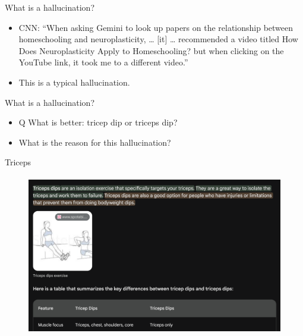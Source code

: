 \begin{vbframe}{What is a hallucination?}

\vfill


	\begin{itemize}

\item
CNN: ``When asking Gemini to look up papers on the relationship
between homeschooling and neuroplasticity, \ldots
[it] \ldots
recommended a video titled How Does
Neuroplasticity Apply to Homeschooling? but when clicking on
the YouTube link, it took me to a different video.''

\item This is a typical hallucination.
\end{itemize}

\vfill

\end{vbframe}

\begin{vbframe}{What is a hallucination?}

\vfill


	\begin{itemize}


\item
 Q What is better: tricep dip or
 triceps dip?

\item \ques What is the reason for this hallucination?

\end{itemize}



\vfill


\end{vbframe}

\begin{vbframe}{Triceps}
\begin{figure}
\centering
\includegraphics[height = 7cm]{figure/triceps1.png}
\end{figure}
\vfill
\end{vbframe}

